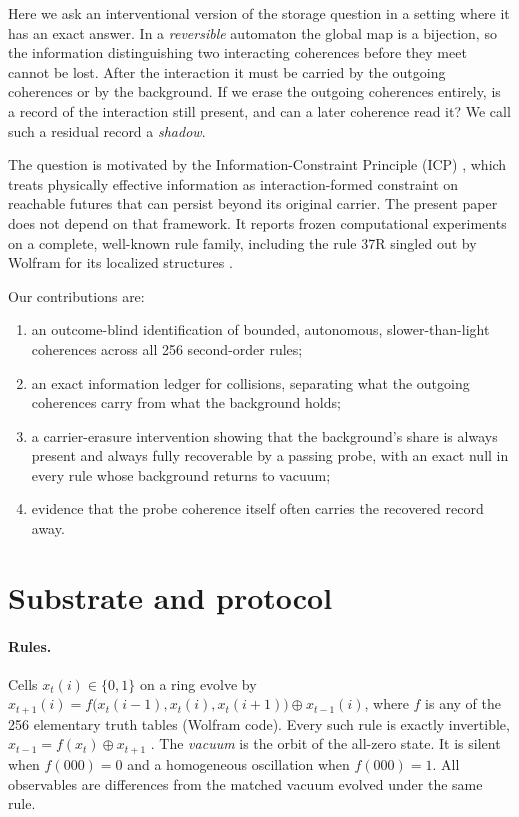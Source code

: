 \documentclass{article}
\begin{document}
Here we ask an interventional version of the storage question in a setting where it has an exact
answer. In a \emph{reversible} automaton the global map is a bijection, so the information
distinguishing two interacting coherences before they meet cannot be lost. After the interaction
it must be carried by the outgoing coherences or by the background. If we erase the outgoing
coherences entirely, is a record of the interaction still present, and can a later coherence read
it? We call such a residual record a \emph{shadow}.

The question is motivated by the Information-Constraint Principle (ICP) \cite{clark2026icp}, which
treats physically effective information as interaction-formed constraint on reachable futures that
can persist beyond its original carrier. The present paper does not depend on that framework. It
reports frozen computational experiments on a complete, well-known rule family, including the rule
37R singled out by Wolfram for its localized structures \cite{wolfram2002}.

Our contributions are:
\begin{enumerate}
\item an outcome-blind identification of bounded, autonomous, slower-than-light coherences across
all 256 second-order rules;
\item an exact information ledger for collisions, separating what the outgoing coherences carry
from what the background holds;
\item a carrier-erasure intervention showing that the background's share is always present and
always fully recoverable by a passing probe, with an exact null in every rule whose background
returns to vacuum;
\item evidence that the probe coherence itself often carries the recovered record away.
\end{enumerate}

\section{Substrate and protocol}
\paragraph{Rules.} Cells $x_t(i)\in\{0,1\}$ on a ring evolve by
$x_{t+1}(i)=f\big(x_t(i-1),x_t(i),x_t(i+1)\big)\oplus x_{t-1}(i)$, where $f$ is any of the 256
elementary truth tables (Wolfram code). Every such rule is exactly invertible,
$x_{t-1}=f(x_t)\oplus x_{t+1}$ \cite{toffoli1990,wolfram2002}. The \emph{vacuum} is the orbit of the
all-zero state. It is silent when $f(000)=0$ and a homogeneous oscillation when $f(000)=1$. All
observables are differences from the matched vacuum evolved under the same rule.
\end{document}
